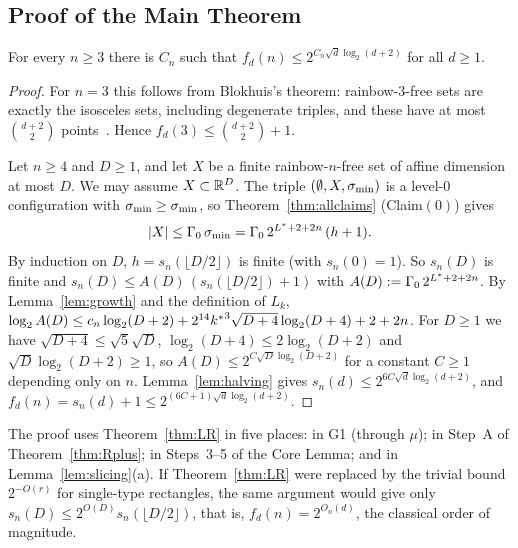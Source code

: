 \subsection{Proof of the Main Theorem}

\begin{theorem}\label{thm:main}
For every $n\ge3$ there is $C_n$ such that $f_d(n)\le2^{C_n\sqrt d\log_2(d+2)}$ for all $d\ge1$.
\end{theorem}
\begin{proof}
For $n=3$ this follows from Blokhuis's theorem: rainbow-$3$-free sets are exactly the isosceles sets, including
degenerate triples, and these have at most $\binom{d+2}2$ points~\cite{Blokhuis}. Hence $f_d(3)\le\binom{d+2}2+1$.

Let $n\ge4$ and $D\ge1$, and let $X$ be a finite rainbow-$n$-free set of affine dimension at most $D$. We may assume
$X\subset\mathbb{R}^D$. The triple $(\emptyset,X,\sigma_{\min})$ is a level-$0$ configuration with $\sigma_{\min}\ge\sigma_{\min}$, so
Theorem~\ref{thm:allclaims} (Claim$(0)$) gives
\[
|X|\le\Gamma_0\,\sigma_{\min}=\Gamma_0\,2^{L^{\ast}+2+2n}\,(h+1).
\]
By induction on $D$, $h=s_n(\lfloor D/2\rfloor)$ is finite (with $s_n(0)=1$). So $s_n(D)$ is finite and
$s_n(D)\le A(D)\,(s_n(\lfloor D/2\rfloor)+1)$ with $A(D):=\Gamma_0\,2^{L^{\ast}+2+2n}$. By Lemma~\ref{lem:growth} and the definition
of $L_k$, $\log_2A(D)\le c_n\log_2(D+2)+2^{14}{k^{\ast}}^{3}\sqrt{D+4}\log_2(D+4)+2+2n$. For $D\ge1$ we have
$\sqrt{D+4}\le\sqrt5\sqrt D$, $\log_2(D+4)\le2\log_2(D+2)$ and $\sqrt D\log_2(D+2)\ge1$, so
$A(D)\le2^{C\sqrt D\log_2(D+2)}$ for a constant $C\ge1$ depending only on $n$. Lemma~\ref{lem:halving} gives
$s_n(d)\le2^{6C\sqrt d\log_2(d+2)}$, and $f_d(n)=s_n(d)+1\le2^{(6C+1)\sqrt d\log_2(d+2)}$.
\end{proof}

\begin{remark}
The proof uses Theorem~\ref{thm:LR} in five places: in G1 (through $\mu$); in Step~A of Theorem~\ref{thm:Rplus}; in
Steps~3--5 of the Core Lemma; and in Lemma~\ref{lem:slicing}(a). If Theorem~\ref{thm:LR} were replaced by the trivial
bound $2^{-O(r)}$ for single-type rectangles, the same argument would give only $s_n(D)\le2^{O(D)}s_n(\lfloor D/2\rfloor)$, that
is, $f_d(n)=2^{O_n(d)}$, the classical order of magnitude.
\end{remark}
